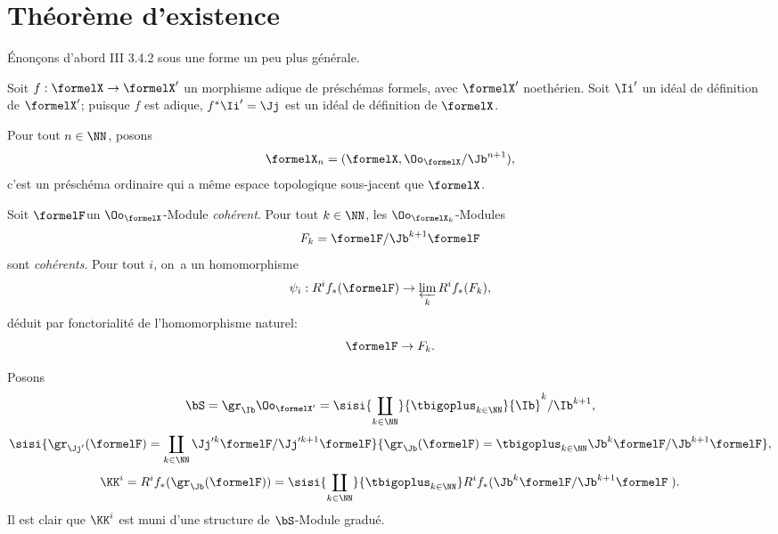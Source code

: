 \section{Th\'eor\`eme d'existence}

\'Enon\c cons d'abord \EGA III 3.4.2 sous une forme un peu plus
g\'en\'erale.

Soit $f:\formelX \to \formelX'$ un morphisme adique de pr\'esch\'emas formels, avec $\formelX'$ noeth\'erien. Soit $\Ii'$ un id\'eal de d\'efinition de $\formelX'$; puisque $f$ est adique, $f^*\Ii'=\Jj$ est un id\'eal de d\'efinition de $\formelX$.

Pour tout $n\in \NN$, posons \label{IX.2}
\begin{equation} \label{eq:IX.2.1}
\formelX_n=(\formelX, \Oo_\formelX/{\Jb}^{n+1}),
\end{equation}
c'est un pr\'esch\'ema ordinaire qui a m\^eme espace topologique sous-jacent que $\formelX$.

Soit $\formelF$\pageoriginale un $\Oo_\formelX$-Module \emph{coh\'erent}. Pour tout $k\in\NN$, les $\Oo_{\formelX_k}$-Modules
\begin{equation} \label{eq:IX.2.2}
F_k=\formelF/{\Jb}^{k+1}\formelF
\end{equation}
sont \emph{coh\'erents}. Pour tout $i$, on~a un homomorphisme
\begin{equation} \label{eq:IX.2.3} \psi_i: R^if_*(\formelF) \to \varprojlim_k R^if_*(F_k),
\end{equation}
d\'eduit par fonctorialit\'e de l'homomorphisme naturel:
\begin{equation} \label{eq:IX.2.4} \formelF \to F_k.
\end{equation}

Posons
\begin{equation} \label{eq:IX.2.5}
\bS= \gr_{{\Ib}}\Oo_{\formelX'}=\sisi{\coprod_{k \in \NN}}{\tbigoplus_{k \in \NN}} {\Ib}^k/{\Ib}^{k+1},
\end{equation}
\begin{equation} \label{eq:IX.2.6} \sisi{\gr_{\Jj'}(\formelF)=\coprod_{k \in \NN} \Jj'^k\formelF/\Jj'^{k+1}\formelF}{\gr_{\Jb}(\formelF)=\tbigoplus_{k \in \NN} {\Jb}^k\formelF/{\Jb}^{k+1}\formelF},
\end{equation}
\begin{equation} \label{eq:IX.2.7} \KK^i=R^if_*(\gr_{{\Jb}}(\formelF))=\sisi{\coprod_{k \in \NN}}{\tbigoplus_{k \in \NN}}R^if_* ({\Jb}^k \formelF/{\Jb}^{k+1}\formelF\;).
\end{equation}
Il est clair que $\KK^i$ est muni d'une structure de $\bS$-Module gradu\'e.

